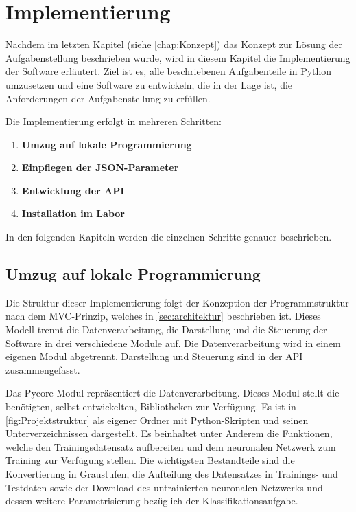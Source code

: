 \chapter{Implementierung} \label{chap:implementierung}

Nachdem im letzten Kapitel (siehe \autoref{chap:Konzept}) das Konzept zur Lösung der Aufgabenstellung beschrieben wurde, wird in diesem Kapitel die Implementierung der Software erläutert.
Ziel ist es, alle beschriebenen Aufgabenteile in Python umzusetzen und eine Software zu entwickeln, die in der Lage ist, die Anforderungen der Aufgabenstellung zu erfüllen. 

Die Implementierung erfolgt in mehreren Schritten:

\begin{enumerate}
    \item \textbf{Umzug auf lokale Programmierung} 
    \item \textbf{Einpflegen der JSON-Parameter} 
    \item \textbf{Entwicklung der API} 
    \item \textbf{Installation im Labor}
\end{enumerate}

In den folgenden Kapiteln werden die einzelnen Schritte genauer beschrieben.

\section{Umzug auf lokale Programmierung} \label{subsec:umzug_auf_lokale_programmierung}

Die Struktur dieser Implementierung folgt der Konzeption der Programmstruktur nach dem MVC-Prinzip, welches in \autoref{sec:architektur} beschrieben ist.
Dieses Modell trennt die Datenverarbeitung, die Darstellung und die Steuerung der Software in drei verschiedene Module auf.
Die Datenverarbeitung wird in einem eigenen Modul abgetrennt. Darstellung und Steuerung sind in der API zusammengefasst.

Das Pycore-Modul repräsentiert die Datenverarbeitung. Dieses Modul stellt die benötigten, selbst entwickelten, Bibliotheken zur Verfügung. Es ist in \autoref{fig:Projektstruktur} als eigener Ordner mit Python-Skripten und seinen Unterverzeichnissen dargestellt. Es beinhaltet  unter Anderem die Funktionen, welche den Trainingsdatensatz aufbereiten und dem neuronalen Netzwerk zum Training zur Verfügung stellen.
Die wichtigsten Bestandteile sind die Konvertierung in Graustufen, die Aufteilung des Datensatzes in Trainings- und Testdaten sowie der Download des untrainierten neuronalen Netzwerks und dessen weitere Parametrisierung bezüglich der Klassifikationsaufgabe.


